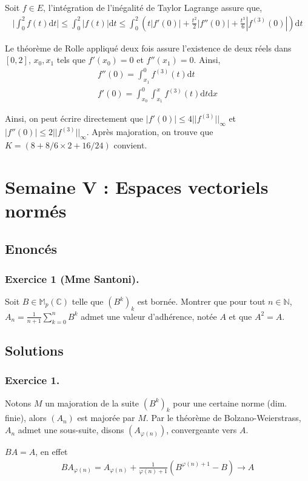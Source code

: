 \documentclass{article}
\begin{document}
Soit $f \in E$, l'intégration de l'inégalité de Taylor Lagrange assure que, 
\begin{align*}
	\bigg|\int_{0}^2 f(t)\mathrm{d}t\bigg|\leq \int_{0}^2 |f(t)|\mathrm{d}t\leq \int_{0}^2 (t|f'(0)| + \frac{t^2}{2}|f''(0)|+\frac{t^3}{6}|f^{(3)}(0)|)\mathrm{d}t
\end{align*}

Le théorème de Rolle appliqué deux fois assure l'existence de deux réels dans $[0, 2]$, $x_0, x_1$ tels que $f'(x_0) = 0$ et $f''(x_1) = 0$. Ainsi, 
\begin{align*}
	f''(0) = \int_{x_1}^{0}f^{(3)}(t)\mathrm{d}t\\
	f'(0) = \int_{x_0}^{0} \int_{x_1}^{x}f^{(3)}(t)\mathrm{d}t \mathrm{d}x
\end{align*}

Ainsi, on peut écrire directement que $|f'(0)| \leq 4||f^{(3)}||_{\infty}$ et $|f''(0)|\leq 2||f^{(3)}||_{\infty}$. Après majoration, on trouve que $K = (8+8/6\times 2+16/24)$ convient.

\section{Semaine V : Espaces vectoriels normés}
\subsection*{Enoncés}
\subsubsection*{Exercice 1 (Mme Santoni).}
Soit $B \in\mathbb{M}_p(\mathbb{C})$ telle que $(B^k)_k$ est bornée. Montrer que pour tout $n\in\mathbb{N}$, $A_n = \displaystyle \frac{1}{n+1}\sum_{k=0}^n B^k$ admet une valeur d'adhérence, notée $A$ et que $A^2 = A$.
\subsection*{Solutions}
\subsubsection*{Exercice 1.}
Notons $M$ un majoration de la suite $(B^k)_k$ pour une certaine norme (dim. finie), alors $(A_n)$ est majorée par $M$. Par le théorème de Bolzano-Weierstrass, $A_n$ admet une sous-suite, disons $(A_{\varphi(n)})$, convergeante vers $A$.

$BA = A$, en effet
\begin{align*}
	B A_{\varphi(n)} = A_{\varphi(n)} + \frac{1}{\varphi(n)+1}(B^{\varphi(n)+1} - B) \to A
	\end{align*}
\end{document}
